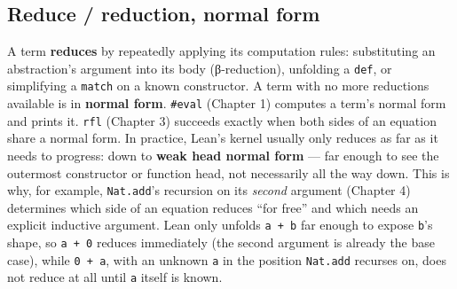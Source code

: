 \subsection{Reduce / reduction, normal form}\label{sec:01-basics:04-terminology:5}

A term \textbf{reduces} by repeatedly applying its computation rules: substituting an abstraction's argument into its body (β-reduction), unfolding a \texttt{def}, or simplifying a \texttt{match} on a known constructor. A term with no more reductions available is in \textbf{normal form}. \texttt{\#eval} (Chapter 1) computes a term's normal form and prints it. \texttt{rfl} (Chapter 3) succeeds exactly when both sides of an equation share a normal form. In practice, Lean's kernel usually only reduces as far as it needs to progress: down to \textbf{weak head normal form} --- far enough to see the outermost constructor or function head, not necessarily all the way down. This is why, for example, \texttt{Nat.add}'s recursion on its \emph{second} argument (Chapter 4) determines which side of an equation reduces ``for free'' and which needs an explicit inductive argument. Lean only unfolds \texttt{a + b} far enough to expose \texttt{b}'s shape, so \texttt{a + 0} reduces immediately (the second argument is already the base case), while \texttt{0 + a}, with an unknown \texttt{a} in the position \texttt{Nat.add} recurses on, does not reduce at all until \texttt{a} itself is known.

